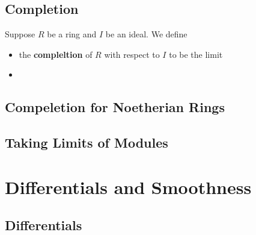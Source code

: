 \documentclass[Total.tex]{subfiles}
\begin{document}
		\section{Completion}
	
		\begin{Def} Suppose $R$ be a ring and $I$ be an ideal. We define 
			\begin{itemize}
				\item the \textbf{compleltion} of $R$ with respect to $I$ to be the limit
				\item 
			\end{itemize}
		\end{Def}
		
		\section{Compeletion for Noetherian Rings}
		
		\section{Taking Limits of Modules}
	\chapter{Differentials and Smoothness}
	
		\section{Differentials}
\end{document}
